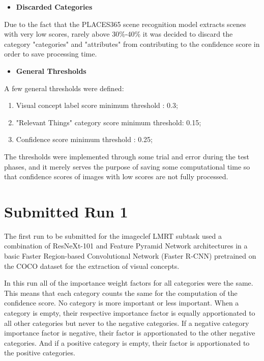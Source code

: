     \begin{itemize}
      \item \textbf{Discarded Categories}
    \end{itemize}
    
    Due to the fact that the PLACES365 scene recognition model extracts scenes with very low scores, rarely above 30\%-40\% it was decided to discard the category "categories" and "attributes" from contributing to the confidence score in order to save processing time.

   \newpage
    \begin{itemize}
      \item \textbf{General Thresholds}
    \end{itemize}

    A few general thresholds were defined:

   \begin{enumerate}
    \item Visual concept label score minimum threshold : 0.3;
    \item "Relevant Things" category score  minimum threshold: 0.15;
    \item Confidence score minimum threshold  : 0.25;
   \end{enumerate}


   The thresholds were implemented through some trial and error during the test phases, and it merely serves the purpose of saving some computational time so that confidence scores of images with low scores are not fully processed. 



    \section{Submitted Run 1}
      \label{sec:run1}

    The first run to be submitted for the imageclef LMRT subtask used a combination of ResNeXt-101 and Feature Pyramid Network architectures in a basic Faster Region-based Convolutional Network (Faster R-CNN) pretrained on the COCO dataset for the extraction of visual concepts.

    In this run all of the importance weight factors for all categories were the same. This means that each category counts the same for the computation of the confidence score. No category is more important or less important. When a category is empty, their respective importance factor is equally apportionated to all other categories but never to the negative categories. If a negative category importance factor is negative, their factor is apportionated to the other negative categories. And if a positive category is empty, their factor is apportionated to the positive categories.

